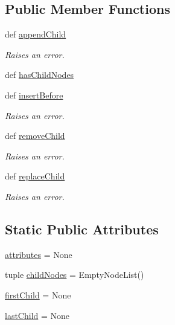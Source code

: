 \subsection*{Public Member Functions}
\begin{DoxyCompactItemize}
\item 
def \hyperlink{classodf_1_1element_1_1Childless_a49fc4deafdc33d7f017f6c41749f5148}{append\+Child}
\begin{DoxyCompactList}\small\item\em Raises an error. \end{DoxyCompactList}\item 
def \hyperlink{classodf_1_1element_1_1Childless_a9f3f1b00e65a6ce687d2bf14ffe5baf2}{has\+Child\+Nodes}
\item 
def \hyperlink{classodf_1_1element_1_1Childless_a70f9703eec71a5bb0e11d0b103d3d2cf}{insert\+Before}
\begin{DoxyCompactList}\small\item\em Raises an error. \end{DoxyCompactList}\item 
def \hyperlink{classodf_1_1element_1_1Childless_a2402048d2c1f8111d760251879db5dc4}{remove\+Child}
\begin{DoxyCompactList}\small\item\em Raises an error. \end{DoxyCompactList}\item 
def \hyperlink{classodf_1_1element_1_1Childless_abbe6bb396f159cf279b90d20dafc93c6}{replace\+Child}
\begin{DoxyCompactList}\small\item\em Raises an error. \end{DoxyCompactList}\end{DoxyCompactItemize}
\subsection*{Static Public Attributes}
\begin{DoxyCompactItemize}
\item 
\hyperlink{classodf_1_1element_1_1Childless_a974831eaa784b87dd106703dc26cf5a7}{attributes} = None
\item 
tuple \hyperlink{classodf_1_1element_1_1Childless_ae9ed4266fb5a1ee7130cac60657b59e9}{child\+Nodes} = Empty\+Node\+List()
\item 
\hyperlink{classodf_1_1element_1_1Childless_aadc41dd016ecd19cd96232e5309b17f3}{first\+Child} = None
\item 
\hyperlink{classodf_1_1element_1_1Childless_a846e55e8931bcc3c90754e3b45110e96}{last\+Child} = None
\end{DoxyCompactItemize}


